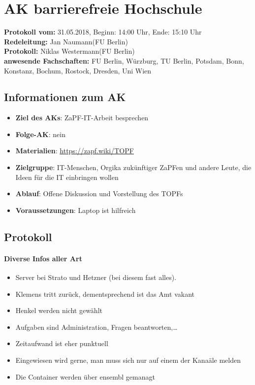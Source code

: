 
\section{AK barrierefreie Hochschule}

  \textbf{Protokoll vom:} 31.05.2018,
  Beginn: 14:00 Uhr,
  Ende: 15:10 Uhr \\
  \textbf{Redeleitung:} Jan Naumann(FU Berlin) \\
  \textbf{Protokoll:} Niklas Westermann(FU Berlin) \\
  \textbf{anwesende Fachschaften:} FU Berlin, Würzburg, TU Berlin, Potsdam, Bonn, Konstanz, Bochum, Rostock, Dresden, Uni Wien

  \subsection*{Informationen zum AK}
    \begin{itemize}
      \item \textbf{Ziel des AKs}: ZaPF-IT-Arbeit besprechen
      \item \textbf{Folge-AK}: nein
      \item \textbf{Materialien}: \url{https://zapf.wiki/TOPF}
      \item \textbf{Zielgruppe}: IT-Menschen, Orgika zukünftiger ZaPFen und andere Leute, die Ideen für die IT einbringen wollen
      \item \textbf{Ablauf}: Offene Diskussion und Vorstellung des TOPFs
      \item \textbf{Voraussetzungen}: Laptop ist hilfreich
    \end{itemize}

  \subsection*{Protokoll}
    \paragraph{Diverse Infos aller Art}
      \begin{itemize}
        \item Server bei Strato und Hetzner (bei diesem fast alles).
        \item Klemens tritt zurück, dementsprechend ist das Amt vakant
        \item Henkel werden nicht gewählt
        \item Aufgaben sind Administration, Fragen beantworten,…
        \item Zeitaufwand ist eher punktuell
        \item Eingewiesen wird gerne, man muss sich nur auf einem der Kanaäle melden
        \item Die Container werden über ensembl gemanagt
      \end{itemize}

